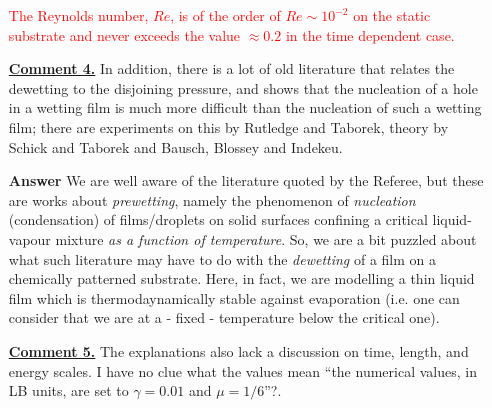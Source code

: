 \documentclass[12pt,english]{article}
\begin{document}
\begin{itemize}
{\textcolor{red}{The Reynolds number, $Re$, is of the order of $Re \sim 10^{-2}$ on the 
static substrate and never exceeds the value $\approx 0.2$ in the time dependent case.}

}

\item[ \textbf{\underline{Comment 4.}}]
{ 
In addition, there is a lot of old literature that relates the dewetting to the disjoining pressure, and shows that the nucleation of a hole in a wetting film is much more difficult than the nucleation of such a wetting film; there are experiments on this by Rutledge and Taborek, theory by Schick and Taborek and Bausch, Blossey and Indekeu.
}

\item[ \textbf{{Answer}}]
{
We are well aware of the literature quoted by the Referee, but these are works 
about {\it prewetting}, namely the phenomenon of {\it nucleation} (condensation)
of films/droplets on solid surfaces confining a critical liquid-vapour mixture
{\it as a function of temperature}. So, we are a bit puzzled about what such literature may have to do with the {\it dewetting} of a film on a chemically patterned substrate. Here, in fact, we are modelling a thin liquid film which is thermodaynamically stable against evaporation (i.e. one can consider that 
we are at a - fixed - temperature below the critical one).
}

\item[ \textbf{\underline{Comment 5.}}]
{ 
The explanations also lack a discussion on time, length, and energy scales. 
I have no clue what the values mean ``the numerical values, in LB units, are set to $\gamma= 0.01$ and $\mu = 1/6$''?. 
}


\end{itemize}
\end{document}
